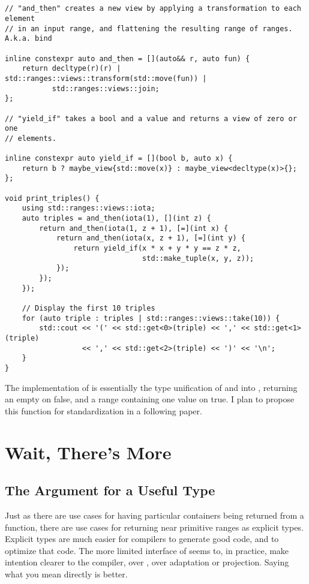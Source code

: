 \documentclass[a4paper,10pt,oneside,openany,final,article]{memoir}
\begin{document}
\begin{minipage}[t]{\columnwidth}
  \begin{verbatim}


// "and_then" creates a new view by applying a transformation to each element
// in an input range, and flattening the resulting range of ranges. A.k.a. bind

inline constexpr auto and_then = [](auto&& r, auto fun) {
    return decltype(r)(r) | std::ranges::views::transform(std::move(fun)) |
           std::ranges::views::join;
};

// "yield_if" takes a bool and a value and returns a view of zero or one
// elements.

inline constexpr auto yield_if = [](bool b, auto x) {
    return b ? maybe_view{std::move(x)} : maybe_view<decltype(x)>{};
};

void print_triples() {
    using std::ranges::views::iota;
    auto triples = and_then(iota(1), [](int z) {
        return and_then(iota(1, z + 1), [=](int x) {
            return and_then(iota(x, z + 1), [=](int y) {
                return yield_if(x * x + y * y == z * z,
                                std::make_tuple(x, y, z));
            });
        });
    });

    // Display the first 10 triples
    for (auto triple : triples | std::ranges::views::take(10)) {
        std::cout << '(' << std::get<0>(triple) << ',' << std::get<1>(triple)
                  << ',' << std::get<2>(triple) << ')' << '\n';
    }
}

\end{verbatim}
\end{minipage}

The implementation of  is essentially the type unification of  and  into , returning an empty on false, and a range containing one value on true. I plan to propose this function for standardization in a following paper.

\chapter{Wait, There's More}
\section{The Argument for a Useful Type}

Just as there are use cases for having particular containers being returned from a function, there are use cases for returning near primitive ranges as explicit types. Explicit types are much easier for compilers to generate good code, and to optimize that code. The more limited interface of  seems to, in practice, make intention clearer to the compiler, over , over adaptation or projection. Saying what you mean directly is better.
\end{document}
